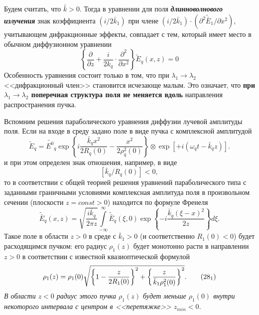 \documentclass[a4paper]{article}
\begin{document}
Будем считать, что $\overline{\bar{k}}>0$. Тогда в уравнении для поля \textbf{\textit{длинноволнового излучения}} знак коэффициента $\left(i/2\bar{k}_{1}\right)$ при члене $\left(i/2\bar{k}_{1}\right)\cdot\left(\partial^{2}\tilde{\bar{E}}_{1}/\partial x^{2}\right)$, учитывающем дифракционные эффекты, совпадает с тем, который имеет место в обычном диффузионном уравнении $$\left\{\frac{\partial}{\partial z}+\frac{i}{2k_{q}}\cdot\frac{\partial^{2}}{\partial x^{2}}\right\}\tilde{E}_{q}(x,z)=0$$
Особенность уравнения состоит только в том, что при  $\lambda_{1}\rightarrow\lambda_{2}$ <<дифракционный член>> становится исчезающе малым. Это означает, что \textbf{при  $\lambda_{1}\rightarrow\lambda_{2}$ поперечная структура поля не меняется вдоль} направления распространения пучка.

Вспомним решения параболического уравнения диффузии лучевой амплитуды поля.  Если на входе в среду задано поле в виде пучка с комплексной амплитудой 
\begin{equation}
	\tilde{E}_{q}=\tilde{E^{0}}_{q}\exp\left\{i\frac{\bar{k}_{q}x^{2}}{2R_{q}(0)}-\frac{x^{2}}{2\rho_{q}^{2}(0)}\right\}\otimes\exp\left[+i\left(\omega_{q}t-\bar{k}_{q}z\right)\right].
	\label{1.5.25}
\end{equation}
и при этом определен знак отношения, например, в виде  
\begin{equation}
	\left[\bar{k}_{q}/R_{q}(0)\right]<0,
	\label{1.5.26}
\end{equation}
то в соответствии с общей теорией решения уравнений параболического типа с заданными граничными условиями комплексная амплитуда поля в произвольном сечении (плоскости $z=const>0$) находится по формуле Френеля 
\begin{equation}
	\tilde{\bar{E}}_{q}(x,z)=\sqrt{\frac{i\bar{k}_{q}}{2\pi z}}\int\limits_{-\infty}^{\infty}\tilde{\bar{E}}_{q}(\xi,0)\exp\left\{-i\frac{\bar{k}_{q}(\xi-x)^{2}}{2z}\right\}d\xi.
	\label{1.5.27}
\end{equation}
Такое поле в области $z>0$  в среде с $\bar{k}_{1}>0$  (и соответственно  $R_{1}(0)<0$) будет расходящимся пучком: его радиус $\rho_{1}(z)$  будет монотонно расти в направлении $z>0$  в соответствии с известной квазиоптической формулой 
\begin{equation}
	\rho_{1}(z)=\rho_{1}(0)\sqrt{\left\{1-\frac{z}{2R_{1}(0)}\right\}^{2}+\left\{\frac{z}{\bar{k}_{1}\rho_{1}^{2}(0)}\right\}^{2}}.
	\label{1.5.28.1}\tag{$28_{1}$}
\end{equation}
\textit{В области $z<0$  радиус этого пучка $\rho_{1}(z)$  будет меньше $\rho_{1}(0)$  внутри некоторого интервала с центром в <<перетяжке>> $z_{min}<0$.}
\end{document}
